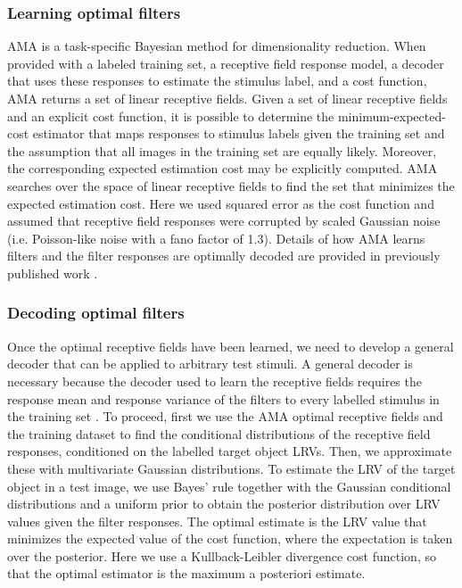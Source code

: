 \documentclass{jov}
\begin{document}
\subsubsection*{Learning optimal filters}
AMA is a task-specific Bayesian method for dimensionality reduction.
When provided with a labeled training set, a receptive field response model, a decoder that uses these responses to estimate the stimulus label, and a cost function, AMA returns a set of linear receptive fields.
Given a set of linear receptive fields and an explicit cost function, it is possible to determine the minimum-expected-cost estimator that maps responses to stimulus labels given the training set and the 
assumption that all images in the training set are equally likely.
Moreover, the corresponding expected estimation cost may be explicitly computed.
AMA searches over the space of linear receptive fields to find the set that minimizes the expected estimation cost.
Here we used squared error as the cost function and assumed that receptive field responses were corrupted by scaled Gaussian noise (i.e. Poisson-like noise with a fano factor of 1.3).
Details of how AMA learns filters and the filter responses are optimally decoded are provided in previously published work \cite{geisler2009optimal,burge2017accuracy,jaini2017linking}.

\subsubsection*{Decoding optimal filters}

Once the optimal receptive fields have been learned, we need to develop a general decoder that can be applied to arbitrary test stimuli.
A general decoder is necessary because the decoder used to learn the receptive fields requires the response mean and response variance of the filters to every labelled stimulus in the training set \cite{geisler2009optimal,burge2017accuracy}.
To proceed, first we use the AMA optimal receptive fields and the training dataset to find the conditional distributions of the receptive field responses, conditioned on the labelled target object LRVs.
Then, we approximate these with multivariate Gaussian distributions.
To estimate the LRV of the target object in a test image, we use Bayes' rule together with the Gaussian conditional distributions and a uniform prior to obtain the posterior distribution over LRV values given the filter responses.
The optimal estimate is the LRV value that minimizes the expected value of the cost function, where the expectation is taken over the posterior.
Here we use a Kullback-Leibler divergence cost function, so that the optimal estimator is the maximum a posteriori estimate.
\end{document}
